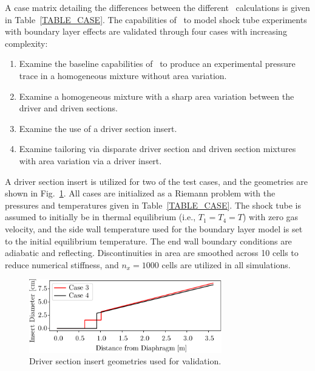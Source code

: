 A case matrix detailing the differences between the different \stnshk\ calculations is given in Table~\ref{TABLE_CASE}. The capabilities of \stnshk\ to model shock tube experiments with boundary layer effects are validated through four cases with increasing complexity:
\begin{enumerate}
	\item Examine the baseline capabilities of \stnshk\ to produce an experimental pressure trace in a homogeneous mixture without area variation.
	\item Examine a homogeneous mixture with a sharp area variation between the driver and driven sections.
	\item Examine the use of a driver section insert.
	\item Examine tailoring via disparate driver section and driven section mixtures with area variation via a driver insert. 
\end{enumerate}
A driver section insert is utilized for two of the test cases, and the geometries are shown in Fig.~\ref{FIG_DIVG}. All cases are initialized as a Riemann problem with the pressures and temperatures given in Table~\ref{TABLE_CASE}. The shock tube is assumed to initially be in thermal equilibrium (i.e., $T_1=T_4=T$) with zero gas velocity, and the side wall temperature used for the boundary layer model is set to the initial equilibrium temperature. The end wall boundary conditions are adiabatic and reflecting. Discontinuities in area are smoothed across 10 cells to reduce numerical stiffness, and $n_x = 1000$ cells are utilized in all simulations.
\begin{figure}[!h!]
	\centering
	\includegraphics[width=84mm]{driverInsertValidation_geometries}
	\caption{\label{FIG_DIVG} Driver section insert geometries used for validation.} 
\end{figure}
\begin{table}[!ht!]
	\centering
	\footnotesize
	\caption{\label{TABLE_CASE} Summary of configurations for \stnshk\ validation calculations.}
\end{table}

